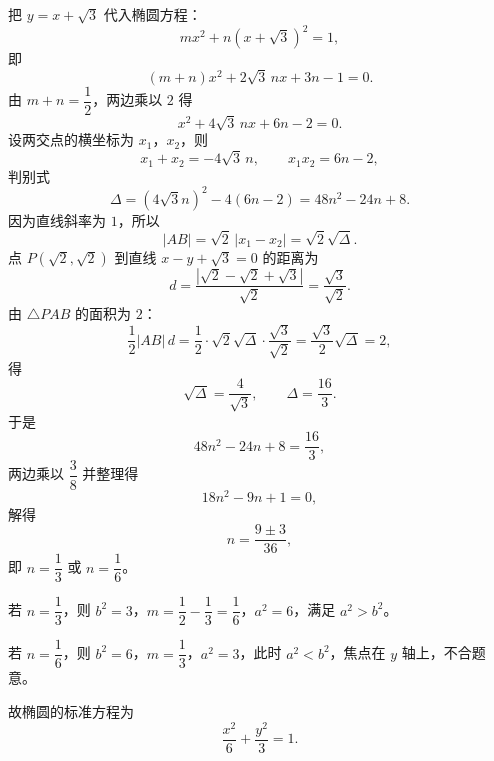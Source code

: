 \begin{answer}
把 $y=x+\sqrt3$ 代入椭圆方程：
\nopagebreak[4]
\[m x^2+n(x+\sqrt3)^2=1,\]
即
\nopagebreak[4]
\[(m+n)x^2+2\sqrt3\,n x+3n-1=0.\]
由 $m+n=\dfrac12$，两边乘以 $2$ 得
\nopagebreak[4]
\[x^2+4\sqrt3\,n x+6n-2=0.\]
设两交点的横坐标为 $x_1$，$x_2$，则
\nopagebreak[4]
\[x_1+x_2=-4\sqrt3\,n,\qquad x_1x_2=6n-2,\]
判别式
\nopagebreak[4]
\[\Delta=(4\sqrt3 n)^2-4(6n-2)=48n^2-24n+8.\]
因为直线斜率为 $1$，所以
\nopagebreak[4]
\[|AB|=\sqrt2\,|x_1-x_2|=\sqrt2\sqrt\Delta.\]
点 $P(\sqrt2,\sqrt2)$ 到直线 $x-y+\sqrt3=0$ 的距离为
\nopagebreak[4]
\[d=\frac{|\sqrt2-\sqrt2+\sqrt3|}{\sqrt2}=\frac{\sqrt3}{\sqrt2}.\]
由 $\triangle PAB$ 的面积为 $2$：
\nopagebreak[4]
\[\frac12|AB|\,d=\frac12\cdot\sqrt2\sqrt\Delta\cdot\frac{\sqrt3}{\sqrt2}=\frac{\sqrt3}2\sqrt\Delta=2,\]
得
\nopagebreak[4]
\[\sqrt\Delta=\frac4{\sqrt3},\qquad \Delta=\frac{16}3.\]
于是
\nopagebreak[4]
\[48n^2-24n+8=\frac{16}3,\]
两边乘以 $\dfrac38$ 并整理得
\nopagebreak[4]
\[18n^2-9n+1=0,\]
解得
\nopagebreak[4]
\[n=\frac{9\pm3}{36},\]
即 $n=\dfrac13$ 或 $n=\dfrac16$。

若 $n=\dfrac13$，则 $b^2=3$，$m=\dfrac12-\dfrac13=\dfrac16$，$a^2=6$，满足 $a^2>b^2$。

若 $n=\dfrac16$，则 $b^2=6$，$m=\dfrac13$，$a^2=3$，此时 $a^2<b^2$，焦点在 $y$ 轴上，不合题意。

故椭圆的标准方程为
\nopagebreak[4]
\[\frac{x^2}6+\frac{y^2}3=1.\]



\end{answer}
